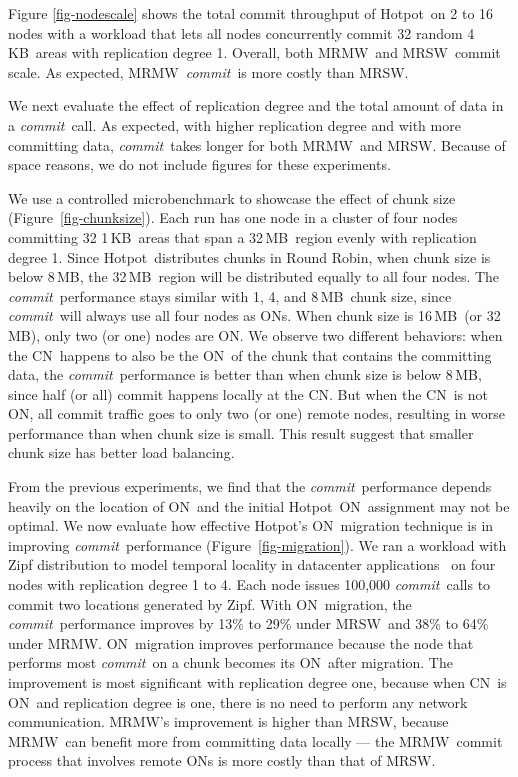 \documentclass[sigconf]{acmart}
\newcommand{\KB}{\,KB}
\newcommand{\MB}{\,MB}
\newcommand{\commitxact}{\textit{commit}}
\newcommand{\hotpot}{Hotpot}
\newcommand{\mrmw}{MRMW}
\newcommand{\mrsw}{MRSW}
\newcommand{\on}{ON}
\newcommand{\xn}{CN}
\begin{document}
{
Figure \ref{fig-nodescale} shows the total commit throughput of \hotpot\ on 2 to 16 nodes with a workload 
that lets all nodes concurrently commit 32 random 4\KB\ areas with replication degree 1. 
Overall, both \mrmw\ and \mrsw\ commit scale.
As expected, \mrmw\ \commitxact\ is more costly than \mrsw. 

We next evaluate the effect of replication degree and the total amount of data in a \commitxact\ call.
As expected, with higher replication degree and with more committing data, \commitxact\ takes longer for both \mrmw\ and \mrsw.
Because of space reasons, we do not include figures for these experiments.

We use a controlled microbenchmark to showcase the effect of chunk size (Figure~\ref{fig-chunksize}).
Each run has one node in a cluster of four nodes committing 32 1\KB\ areas that span a 32\MB\ region evenly with replication degree 1.
Since \hotpot\ distributes chunks in Round Robin, 
when chunk size is below 8\MB, the 32\MB\ region will be distributed equally to all four nodes.
The \commitxact\ performance stays similar with 1, 4, and 8\MB\ chunk size,
since \commitxact\ will always use all four nodes as \on{}s.
When chunk size is 16\MB\ (or 32\MB), only two (or one) nodes are \on.
We observe two different behaviors:
when the \xn\ happens to also be the \on\ of the chunk that contains the committing data,
the \commitxact\ performance is better than when chunk size is below 8\MB, since half (or all) commit happens locally at the \xn.
But when the \xn\ is not \on, all commit traffic goes to only two (or one) remote nodes,
resulting in worse performance than when chunk size is small.
This result suggest that smaller chunk size has better load balancing.

\noindent{\bf \on\ migration.}
From the previous experiments, we find that the \commitxact\ performance depends heavily on the location of \on\
and the initial \hotpot\ \on\ assignment may not be optimal.
We now evaluate how effective \hotpot's \on\ migration technique is in improving \commitxact\ performance (Figure~\ref{fig-migration}). 
We ran a workload with Zipf distribution to model temporal locality in datacenter applications~\cite{Atikoglu12,Breslau99} on four nodes with replication degree 1 to 4.
Each node issues 100,000 \commitxact\ calls to commit two locations generated by Zipf.
With \on\ migration, the \commitxact\ performance improves by 13\% to 29\% under \mrsw\ and 38\% to 64\% under \mrmw.
\on\ migration improves performance because the node that performs most \commitxact\ on a chunk becomes its \on\ after migration.
The improvement is most significant with replication degree one, 
because when \xn\ is \on\ and replication degree is one, there is no need to perform any network communication.
\mrmw's improvement is higher than \mrsw, because \mrmw\ can benefit more from committing data locally
--- the \mrmw\ commit process that involves remote \on{}s is more costly than that of \mrsw.

}
\end{document}

